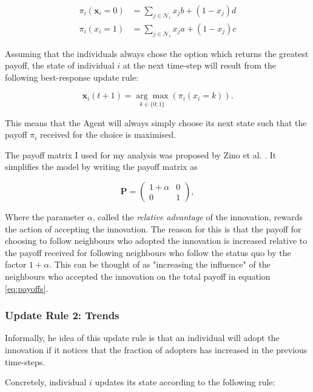 \documentclass[11pt]{article}
\begin{document}
	\begin{equation} \label{eq:payoffs}
		\begin{split}
			\pi_i(\mathbf{x}_i = 0) &= \sum_{j \in \mathcal{N}_i}  x_j b + (1 - x_j) d \\
			\pi_i(x_i = 1) &= \sum_{j \in \mathcal{N}_i}  x_j a + (1 - x_j) c
		\end{split}
	\end{equation}
	
	Assuming that the individuals always chose the option which returns the greatest payoff, the state of individual $i$ at the next time-step will result from the following best-response update rule:
	
	$$\mathbf{x}_i(t+1) = \underset{k \in \{0; 1\}}{\arg \max}(\pi_i(x_i = k)).$$
	
	This means that the Agent will always simply choose its next state such that the payoff $\pi_i$ received for the choice is maximised.
	
	The payoff matrix I used for my analysis was proposed by Zino et al. \autocite{Zino23}. It simplifies the model by writing the payoff matrix as
	
	$$ \mathbf{P} = \begin{pmatrix}
		1 + \alpha & 0 \\
		0          & 1
	\end{pmatrix},$$
	
	Where the parameter $\alpha$, called the \textit{relative advantage} of the innovation, rewards the action of accepting the innovation. The reason for this is that the payoff for choosing to follow neighbours who adopted the innovation is increased relative to the payoff received for following neighbours who follow the status quo by the factor $1+\alpha$. This can be thought of as "increasing the influence" of the neighbours who accepted the innovation on the total payoff in equation \ref{eq:payoffs}. 
	
	\subsubsection{Update Rule 2: Trends}
	Informally, he idea of this update rule is that an individual will adopt the innovation if it notices that the fraction of adopters has increased in the previous time-steps.
	
	Concretely, individual $i$ updates its state according to the following rule:
	
\end{document}
